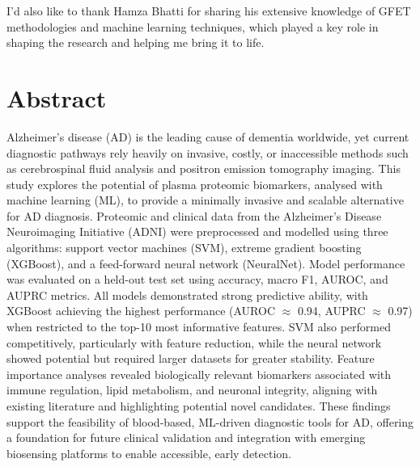 \documentclass[a4paper,12pt]{article}
\begin{document}
I’d also like to thank Hamza Bhatti for sharing his extensive knowledge of GFET methodologies and machine learning techniques, which played a key role in shaping the research and helping me bring it to life.

\section*{Abstract}
\label{abstract}

Alzheimer’s disease (AD) is the leading cause of dementia worldwide, yet current diagnostic pathways rely heavily on invasive, costly, or inaccessible methods such as cerebrospinal fluid analysis and positron emission tomography imaging. This study explores the potential of plasma proteomic biomarkers, analysed with machine learning (ML), to provide a minimally invasive and scalable alternative for AD diagnosis. Proteomic and clinical data from the Alzheimer’s Disease Neuroimaging Initiative (ADNI) were preprocessed and modelled using three algorithms: support vector machines (SVM), extreme gradient boosting (XGBoost), and a feed-forward neural network (NeuralNet). Model performance was evaluated on a held-out test set using accuracy, macro F1, AUROC, and AUPRC metrics. All models demonstrated strong predictive ability, with XGBoost achieving the highest performance (AUROC $\approx$ 0.94, AUPRC $\approx$ 0.97) when restricted to the top-10 most informative features. SVM also performed competitively, particularly with feature reduction, while the neural network showed potential but required larger datasets for greater stability. Feature importance analyses revealed biologically relevant biomarkers associated with immune regulation, lipid metabolism, and neuronal integrity, aligning with existing literature and highlighting potential novel candidates. These findings support the feasibility of blood-based, ML-driven diagnostic tools for AD, offering a foundation for future clinical validation and integration with emerging biosensing platforms to enable accessible, early detection.

\newpage
{}
\vspace*{-2cm}\tableofcontents

\newpage
\listoffigures\label{listoffigures}

\newpage
\listoftables\label{listoftables}

\newpage{}
\end{document}
